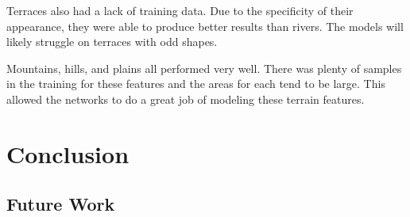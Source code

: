 \documentclass[twocolumn]{article}
\begin{document}
	Terraces also had a lack of training data. Due to the specificity of their appearance, they were able to produce better results than rivers. The models will likely struggle on terraces with odd shapes.
	
	Mountains, hills, and plains all performed very well. There was plenty of samples in the training for these features and the areas for each tend to be large. This allowed the networks to do a great job of modeling these terrain features.

	\section{Conclusion}
	
	
	\subsection{Future Work}

	
		
  
\end{document}
